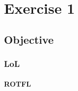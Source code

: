 \chapter{Exercise 1}
\blindtext
\section{Objective}
\blindtext
\subsection{LoL}
\blindtext
\subsubsection{ROTFL}
\blindtext